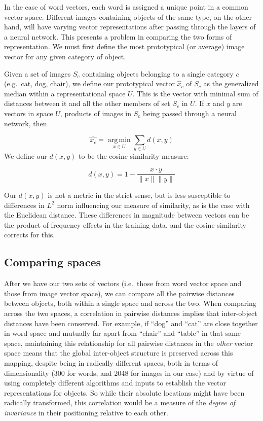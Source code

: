 \documentclass[10pt, letterpaper]{article}
\begin{document}
In the case of word vectors, each word is assigned a unique point in a
common vector space. Different images containing objects of the same
type, on the other hand, will have varying vector representations after
passing through the layers of a neural network. This presents a problem
in comparing the two forms of representation. We must first define the
most prototypical (or average) image vector for any given category of
object.

Given a set of images \(S_c\) containing objects belonging to a single
category \(c\) (e.g.~cat, dog, chair), we define our prototypical vector
\(\hat{x}_c\) of \(S_c\) as the generalized median within a
representational space \(U\). This is the vector with minimal sum of
distances between it and all the other members of set \(S_c\) in \(U\).
If \(x\) and \(y\) are vectors in space \(U\), products of images in
\(S_c\) being passed through a neural network, then

\[
 \hat{x_c} = \operatorname*{arg\,min}_{x\in U} \sum_{y\in U} d(x, y)
\] We define our \(d(x, y)\) to be the cosine similarity measure:

\[
d(x, y) = 1 - \frac{x\cdot y}{\|x\|\|y\|}
\]

Our \(d(x, y)\) is not a metric in the strict sense, but is less
susceptible to differences in \(L^2\) norm influencing our measure of
similarity, as is the case with the Euclidean distance. These
differences in magnitude between vectors can be the product of frequency
effects in the training data, and the cosine similarity corrects for
this.

\subsection{Comparing spaces}\label{comparing-spaces}

After we have our two sets of vectors (i.e.~those from word vector space
and those from image vector space), we can compare all the pairwise
distances between objects, both within a single space and across the
two. When comparing across the two spaces, a correlation in pairwise
distances implies that inter-object distances have been conserved. For
example, if ``dog'' and ``cat'' are close together in word space and
mutually far apart from ``chair'' and ``table'' in that same space,
maintaining this relationship for all pairwise distances in the
\textit{other} vector space means that the global inter-object structure
is preserved across this mapping, despite being in radically different
spaces, both in terms of dimensionality (300 for words, and 2048 for
images in our case) and by virtue of using completely different
algorithms and inputs to establish the vector representations for
objects. So while their absolute locations might have been radically
transformed, this correlation would be a measure of the
\textit{degree of invariance} in their positioning relative to each
other.
\end{document}
